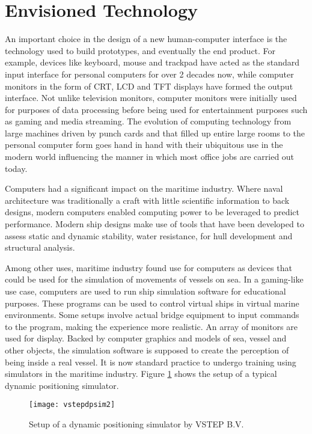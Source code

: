 \section{Envisioned Technology}
\label{sec:envisionedtech}
An important choice in the design of a new human-computer interface is the technology used to build prototypes, and eventually the end product. For example, devices like keyboard, mouse and trackpad have acted as the standard input interface for personal computers for over 2 decades now, while computer monitors in the form of CRT, LCD and TFT displays have formed the output interface. Not unlike television monitors, computer monitors were initially used for purposes of data processing before being used for entertainment purposes such as gaming and media streaming. The evolution of computing technology from large machines driven by punch cards and that filled up entire large rooms to the personal computer form goes hand in hand with their ubiquitous use in the modern world influencing the manner in which most office jobs are carried out today. 

Computers had a significant impact on the maritime industry. Where naval architecture was traditionally a craft with little scientific information to back designs, modern computers enabled computing power to be leveraged to predict performance. Modern ship designs make use of tools that have been developed to assess static and dynamic stability, water resistance, for hull development and structural analysis. 

Among other uses, maritime industry found use for computers as devices that could be used for the simulation of movements of vessels on sea. In a gaming-like use case, computers are used to run ship simulation software for educational purposes. These programs can be used to control virtual ships in virtual marine environments. Some setups involve actual bridge equipment to input commands to the program, making the experience more realistic. An array of monitors are used for display. Backed by computer graphics and models of sea, vessel and other objects, the simulation software is supposed to create the perception of being inside a real vessel. It is now standard practice to undergo training using simulators in the maritime industry. Figure \ref{fig:vstepdpsim} shows the setup of a typical dynamic positioning simulator. 


\begin{figure}
	\centering
	\texttt{[image: vstepdpsim2]}
	\caption{Setup of a dynamic positioning simulator by VSTEP B.V.}
	\label{fig:vstepdpsim}
\end{figure}


